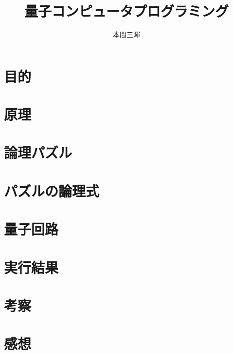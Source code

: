\documentclass[titlepage,a4paper]{jsarticle}
\title{量子コンピュータプログラミング}
\author{本間三暉}
\begin{document}
\maketitle
\section{目的}
\section{原理}
\section{論理パズル}
\section{パズルの論理式}
\section{量子回路}
\section{実行結果}
\section{考察}
\section{感想}
\end{document}
